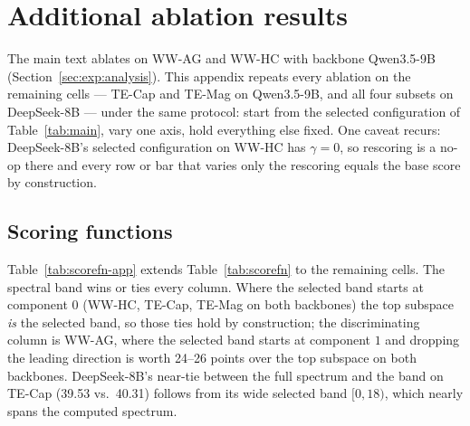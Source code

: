 
\section{Additional ablation results}
\label{app:deepseek-ablations}

The main text ablates \soap on WW-AG and WW-HC with backbone Qwen3.5-9B (Section~\ref{sec:exp:analysis}). This appendix repeats every ablation on the remaining cells --- TE-Cap and TE-Mag on Qwen3.5-9B, and all four subsets on DeepSeek-8B --- under the same protocol: start from the selected configuration of Table~\ref{tab:main}, vary one axis, hold everything else fixed. One caveat recurs: DeepSeek-8B's selected configuration on WW-HC has $\gamma{=}0$, so rescoring is a no-op there and every row or bar that varies only the rescoring equals the base score by construction.

\subsection{Scoring functions}

Table~\ref{tab:scorefn-app} extends Table~\ref{tab:scorefn} to the remaining cells. The spectral band wins or ties every column. Where the selected band starts at component $0$ (WW-HC, TE-Cap, TE-Mag on both backbones) the top subspace \emph{is} the selected band, so those ties hold by construction; the discriminating column is WW-AG, where the selected band starts at component $1$ and dropping the leading direction is worth 24--26 points over the top subspace on both backbones. DeepSeek-8B's near-tie between the full spectrum and the band on TE-Cap (39.53 vs.\ 40.31) follows from its wide selected band $[0, 18)$, which nearly spans the computed spectrum.


